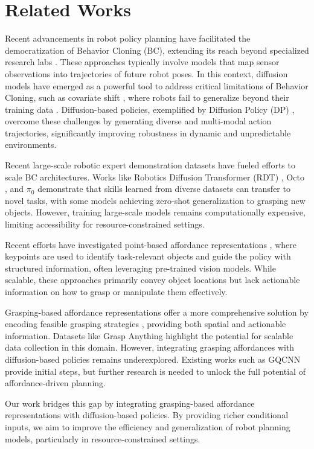 \section{Related Works}
Recent advancements in robot policy planning have facilitated the democratization of Behavior Cloning (BC), extending its reach beyond specialized research labs \cite{aloha, aloha2, umi}. These approaches typically involve models that map sensor observations into trajectories of future robot poses. In this context, diffusion models have emerged as a powerful tool to address critical limitations of Behavior Cloning, such as covariate shift \cite{covariate-shift}, where robots fail to generalize beyond their training data \cite{domain-generalisation}. Diffusion-based policies, exemplified by Diffusion Policy (DP) \cite{diffusion-policy}, overcome these challenges by generating diverse and multi-modal action trajectories, significantly improving robustness in dynamic and unpredictable environments.

Recent large-scale robotic expert demonstration datasets \cite{x-embodiment} have fueled efforts to scale BC architectures. Works like Robotics Diffusion Transformer (RDT) \cite{rdt}, Octo \cite{octo}, and $\pi_0$ \cite{pi0} demonstrate that skills learned from diverse datasets can transfer to novel tasks, with some models achieving zero-shot generalization to grasping new objects. However, training large-scale models remains computationally expensive, limiting accessibility for resource-constrained settings.

Recent efforts have investigated point-based affordance representations \cite{moka, kalie, rekep}, where keypoints are used to identify task-relevant objects and guide the policy with structured information, often leveraging pre-trained vision models. While scalable, these approaches primarily convey object locations but lack actionable information on how to grasp or manipulate them effectively.

Grasping-based affordance representations offer a more comprehensive solution by encoding feasible grasping strategies \cite{grasping-survey}, providing both spatial and actionable information. Datasets like Grasp Anything \cite{grasp-anything} highlight the potential for scalable data collection in this domain. However, integrating grasping affordances with diffusion-based policies remains underexplored. Existing works such as GQCNN \cite{gqcnn} provide initial steps, but further research is needed to unlock the full potential of affordance-driven planning.

Our work bridges this gap by integrating grasping-based affordance representations with diffusion-based policies. By providing richer conditional inputs, we aim to improve the efficiency and generalization of robot planning models, particularly in resource-constrained settings.